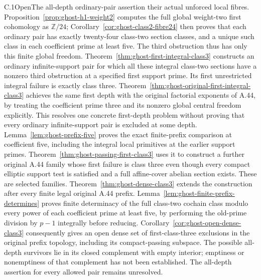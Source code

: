 \begin{result}{C.1}{Open}{The all-depth ordinary-pair assertion}
their actual unforced local fibres. Proposition~\ref{prop:ghost-h1-weight2}
computes the full global weight-two first cohomology as
\(\mathbb Z/24\); Corollary~\ref{cor:ghost-class2-fibre24}
then proves that each ordinary pair has exactly twenty-four
class-two section classes, and a unique such class in each
coefficient prime at least five. The third obstruction thus
has only this finite global freedom.
Theorem~\ref{thm:ghost-first-integral-class3} constructs an
ordinary infinite-support pair for which all these integral
class-two sections have a nonzero third obstruction at a
specified first support prime. Its first unrestricted
integral failure is exactly class three.
Theorem~\ref{thm:ghost-original-first-integral-class3}
achieves the same first depth with the original factorial
exponents of A.44, by treating the coefficient prime three
and its nonzero global central freedom explicitly. This resolves one
concrete first-depth problem without proving that every
ordinary infinite-support pair is excluded at some depth.
Lemma~\ref{lem:ghost-prefix-five} proves the exact
finite-prefix comparison at coefficient five, including
the integral local primitives at the earlier support
primes. Theorem~\ref{thm:ghost-passing-first-class3}
uses it to construct a further original A.44 family
whose first failure is class three even though every
compact elliptic support test is satisfied and a full
affine-cover abelian section exists. These are selected
families. Theorem~\ref{thm:ghost-dense-class3} extends the
construction after every finite legal original A.44 prefix.
Lemma~\ref{lem:ghost-finite-prefix-determines} proves finite
determinacy of the full class-two cochain class modulo every
power of each coefficient prime at least five, by performing
the old-prime division by \(p-1\) integrally before reducing.
Corollary~\ref{cor:ghost-open-dense-class3} consequently gives
an open dense set of first-class-three exclusions in the
original prefix topology, including its compact-passing
subspace. The possible all-depth survivors lie in its closed
complement with empty interior; emptiness or nonemptiness of
that complement has not been established. The all-depth
assertion for every allowed pair remains unresolved.


\end{result}
